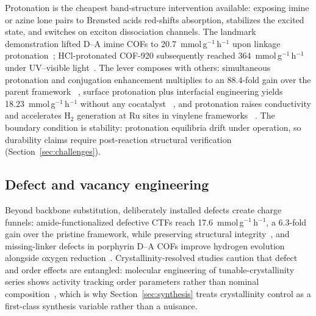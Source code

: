 Protonation is the cheapest band-structure intervention available: exposing
imine or azine lone pairs to Br{\o}nsted acids red-shifts absorption,
stabilizes the excited state, and switches on exciton dissociation channels.
The landmark demonstration lifted D--A imine COFs to
20.7~mmol\,g$^{-1}$\,h$^{-1}$ upon linkage protonation~\cite{yang2021protonated};
HCl-protonated COF-920 subsequently reached 364~mmol\,g$^{-1}$\,h$^{-1}$
under UV--visible light~\cite{dong2025synergistic,dong2025synergisticx}.
The lever composes with others: simultaneous protonation and conjugation
enhancement multiplies to an 88.4-fold gain over the parent framework
~\cite{he2024double}, surface protonation plus interfacial engineering
yields 18.23~mmol\,g$^{-1}$\,h$^{-1}$ without any cocatalyst
~\cite{duan2024protonated}, and protonation raises conductivity and
accelerates H$_2$ generation at Ru sites in vinylene frameworks
~\cite{yu2024vinyl}. The boundary condition is stability: protonation
equilibria drift under operation, so durability claims require post-reaction
structural verification (Section~\ref{sec:challenges}).

\subsection{Defect and vacancy engineering}
\label{sec:defects}

Beyond backbone substitution, deliberately installed defects create charge
funnels: amide-functionalized defective CTFs reach
17.6~mmol\,g$^{-1}$\,h$^{-1}$, a 6.3-fold gain over the pristine framework,
while preserving structural integrity~\cite{gu2026single}, and
missing-linker defects in porphyrin D--A COFs improve hydrogen evolution
alongside oxygen reduction~\cite{yang2026missing}. Crystallinity-resolved
studies caution that defect and order effects are entangled: molecular
engineering of tunable-crystallinity series shows activity tracking order
parameters rather than nominal composition~\cite{xiao2024molecular}, which
is why Section~\ref{sec:synthesis} treats crystallinity control as a
first-class synthesis variable rather than a nuisance.

